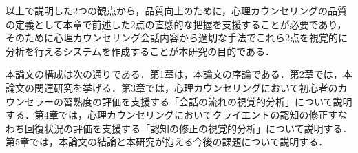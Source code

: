 \documentclass[shuuron]{kuee}
\begin{document}




以上で説明した2つの観点から，品質向上のために，心理カウンセリングの品質の定義として本章で前述した2点の直感的な把握を支援することが必要であり，そのために心理カウンセリング会話内容から適切な手法でこれら2点を視覚的に分析を行えるシステムを作成することが本研究の目的である．

本論文の構成は次の通りである．第1章は，本論文の序論である．第2章では，本論文の関連研究を挙げる．第3章では，心理カウンセリングにおいて初心者のカウンセラーの習熟度の評価を支援する「会話の流れの視覚的分析」について説明する．第4章では，心理カウンセリングにおいてクライエントの認知の修正すなわち回復状況の評価を支援する「認知の修正の視覚的分析」について説明する．第5章では，本論文の結論と本研究が抱える今後の課題について説明する．

%


%
\end{document}
